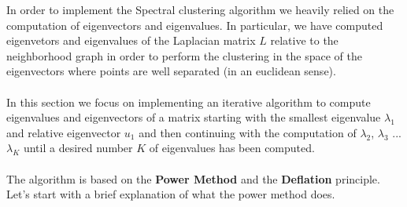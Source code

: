 In order to implement the Spectral clustering algorithm we heavily relied on the computation of eigenvectors and eigenvalues. In particular, we have computed eigenvetors and eigenvalues of the Laplacian matrix \(L\) relative to the neighborhood graph in order to perform the clustering in the space of the eigenvectors where points are well separated (in an euclidean sense). \\
\\
In this section we focus on implementing an iterative algorithm to compute eigenvalues and eigenvectors of a 
matrix starting with the smallest eigenvalue \(\lambda_1\) and relative eigenvector \(u_1\) and then continuing 
with the computation of \(\lambda_2\), \(\lambda_3\) ... \(\lambda_K\) until  a desired number \(K\) of eigenvalues has been computed. 
\\
\\
The algorithm is based on the \textbf{Power Method} and the \textbf{Deflation} principle. Let's start with a brief explanation of what the power method does.
